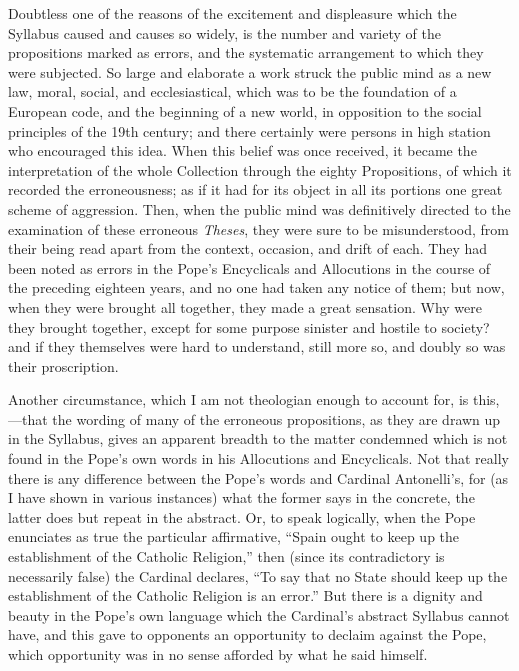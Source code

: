 Doubtless one of the reasons of the excitement and displeasure which
the Syllabus caused and causes so widely, is the number and variety of
the propositions marked as errors, and the systematic arrangement to
which they were subjected. So large and elaborate a work struck the
public mind as a new law, moral, social, and ecclesiastical, which
was to be the foundation of a European code, and the beginning of a new
world, in opposition to the social principles of the 19th century; and
there certainly were persons in high station who encouraged this idea.
When this belief was once received, it became the interpretation of the
whole Collection through the eighty Propositions, of which it recorded
the erroneousness; as if it had for its object in all its portions one
great scheme of aggression. Then, when the public mind was definitively
directed to the examination of these erroneous \emph{Theses}, they were
sure to be misunderstood, from their being read apart from the context,
occasion, and drift of each. They had been noted as errors in the Pope's
Encyclicals and Allocutions in the course of the preceding eighteen
years, and no one had taken any notice of them; but now, when they were
brought all together, they made a great sensation. Why were they brought
together, except for some purpose sinister and hostile to society? and
if they themselves were hard to understand, still more so, and doubly so
was their proscription.

Another circumstance, which I am not theologian enough to account
for, is this,—that the wording of many of the erroneous propositions,
as they are drawn up in the Syllabus, gives an apparent breadth to the
matter condemned which is not found in the Pope's own words in his
Allocutions and Encyclicals. Not that really there is any difference
between the Pope's words and Cardinal Antonelli's, for (as I have shown
in various instances) what the former says in the concrete, the latter
does but repeat in the abstract. Or, to speak logically, when the
Pope enunciates as true the particular affirmative, ``Spain ought to
keep up the establishment of the Catholic Religion,'' then (since
its contradictory is necessarily false) the Cardinal declares, ``To
say that no State should keep up the establishment of the Catholic
Religion is an error.'' But there is a dignity and beauty in the
Pope's own language which the Cardinal's abstract Syllabus cannot have,
and this gave to opponents an opportunity to declaim against the Pope,
which opportunity was in no sense afforded by what he said himself.

